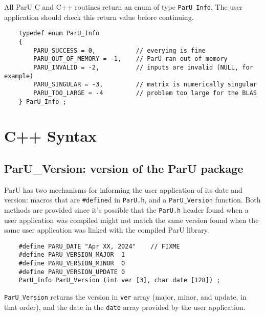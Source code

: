 \documentclass[12pt]{article}
\begin{document}
    All ParU C and C++ routines return an enum of type \verb'ParU_Info'.  The
    user application should check this return value before continuing.

    {\footnotesize
    \begin{verbatim}
    typedef enum ParU_Info
    {
        PARU_SUCCESS = 0,           // everying is fine
        PARU_OUT_OF_MEMORY = -1,    // ParU ran out of memory
        PARU_INVALID = -2,          // inputs are invalid (NULL, for example)
        PARU_SINGULAR = -3,         // matrix is numerically singular
        PARU_TOO_LARGE = -4         // problem too large for the BLAS
    } ParU_Info ; \end{verbatim}}

\section{C++ Syntax}

\subsection{{\sf ParU\_Version}: version of the ParU package}

    ParU has two mechanisms for informing the user application of its date and
    version: macros that are \verb'#define'd in \verb'ParU.h', and a
    \verb'ParU_Version' function.  Both methods are provided since it's
    possible that the \verb'ParU.h' header found when a user application was
    compiled might not match the same version found when the same user
    application was linked with the compiled ParU library.

    {\footnotesize
    \begin{verbatim}
    #define PARU_DATE "Apr XX, 2024"    // FIXME
    #define PARU_VERSION_MAJOR  1
    #define PARU_VERSION_MINOR  0
    #define PARU_VERSION_UPDATE 0
    ParU_Info ParU_Version (int ver [3], char date [128]) ; \end{verbatim}}

    \verb'ParU_Version' returns the version in \verb'ver' array (major, minor,
    and update, in that order), and the date in the \verb'date' array provided
    by the user application.
\end{document}
